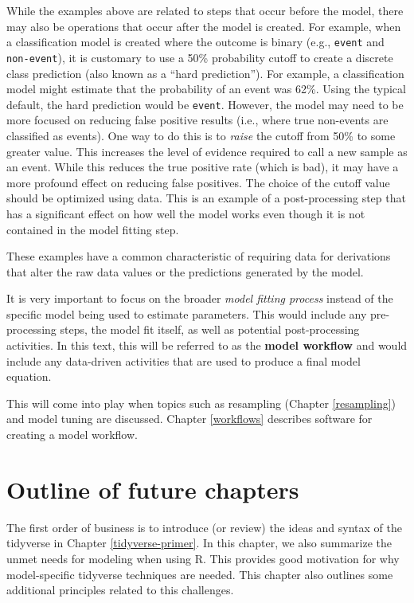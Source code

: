 \documentclass[11pt]{book}
\begin{document}
While the examples above are related to steps that occur before the model, there may also be operations that occur after the model is created. For example, when a classification model is created where the outcome is binary (e.g., \texttt{event} and \texttt{non-event}), it is customary to use a 50\% probability cutoff to create a discrete class prediction (also known as a ``hard prediction''). For example, a classification model might estimate that the probability of an event was 62\%. Using the typical default, the hard prediction would be \texttt{event}. However, the model may need to be more focused on reducing false positive results (i.e., where true non-events are classified as events). One way to do this is to \emph{raise} the cutoff from 50\% to some greater value. This increases the level of evidence required to call a new sample as an event. While this reduces the true positive rate (which is bad), it may have a more profound effect on reducing false positives. The choice of the cutoff value should be optimized using data. This is an example of a post-processing step that has a significant effect on how well the model works even though it is not contained in the model fitting step.

These examples have a common characteristic of requiring data for derivations that alter the raw data values or the predictions generated by the model.

It is very important to focus on the broader \emph{model fitting process} instead of the specific model being used to estimate parameters. This would include any pre-processing steps, the model fit itself, as well as potential post-processing activities. In this text, this will be referred to as the \textbf{model workflow} and would include any data-driven activities that are used to produce a final model equation.

This will come into play when topics such as resampling (Chapter \ref{resampling}) and model tuning are discussed. Chapter \ref{workflows} describes software for creating a model workflow.

\hypertarget{outline-of-future-chapters}{%
\section{Outline of future chapters}\label{outline-of-future-chapters}}

The first order of business is to introduce (or review) the ideas and syntax of the tidyverse in Chapter \ref{tidyverse-primer}. In this chapter, we also summarize the unmet needs for modeling when using R. This provides good motivation for why model-specific tidyverse techniques are needed. This chapter also outlines some additional principles related to this challenges.
\end{document}
